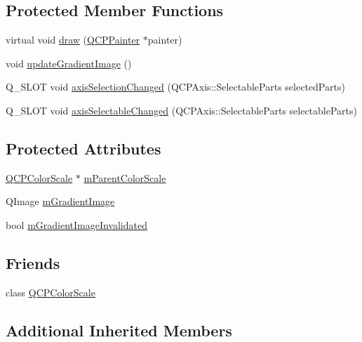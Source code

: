 \subsection*{Protected Member Functions}
\begin{DoxyCompactItemize}
\item 
virtual void \hyperlink{class_q_c_p_color_scale_axis_rect_private_adb67bfe9057a9dd9a85f548c274e6d98}{draw} (\hyperlink{class_q_c_p_painter}{Q\+C\+P\+Painter} $\ast$painter)
\item 
void \hyperlink{class_q_c_p_color_scale_axis_rect_private_a73754cab312aeaddea1bfcc67cc079ac}{update\+Gradient\+Image} ()
\item 
Q\+\_\+\+S\+L\+O\+T void \hyperlink{class_q_c_p_color_scale_axis_rect_private_a6112ad4291ac1695d37659cb049d598d}{axis\+Selection\+Changed} (Q\+C\+P\+Axis\+::\+Selectable\+Parts selected\+Parts)
\item 
Q\+\_\+\+S\+L\+O\+T void \hyperlink{class_q_c_p_color_scale_axis_rect_private_a66d2baed86966bb03a6d7c32dc7d59f7}{axis\+Selectable\+Changed} (Q\+C\+P\+Axis\+::\+Selectable\+Parts selectable\+Parts)
\end{DoxyCompactItemize}
\subsection*{Protected Attributes}
\begin{DoxyCompactItemize}
\item 
\hyperlink{class_q_c_p_color_scale}{Q\+C\+P\+Color\+Scale} $\ast$ \hyperlink{class_q_c_p_color_scale_axis_rect_private_a311c73f51a4cb0b556388197833cf099}{m\+Parent\+Color\+Scale}
\item 
Q\+Image \hyperlink{class_q_c_p_color_scale_axis_rect_private_ad4f7c8ee1c6012d9950870811773119c}{m\+Gradient\+Image}
\item 
bool \hyperlink{class_q_c_p_color_scale_axis_rect_private_a2c0b15b071e1f93006b48b5be022a631}{m\+Gradient\+Image\+Invalidated}
\end{DoxyCompactItemize}
\subsection*{Friends}
\begin{DoxyCompactItemize}
\item 
class \hyperlink{class_q_c_p_color_scale_axis_rect_private_a60f6031408a325ebd1bbbad1ccf9b897}{Q\+C\+P\+Color\+Scale}
\end{DoxyCompactItemize}
\subsection*{Additional Inherited Members}


